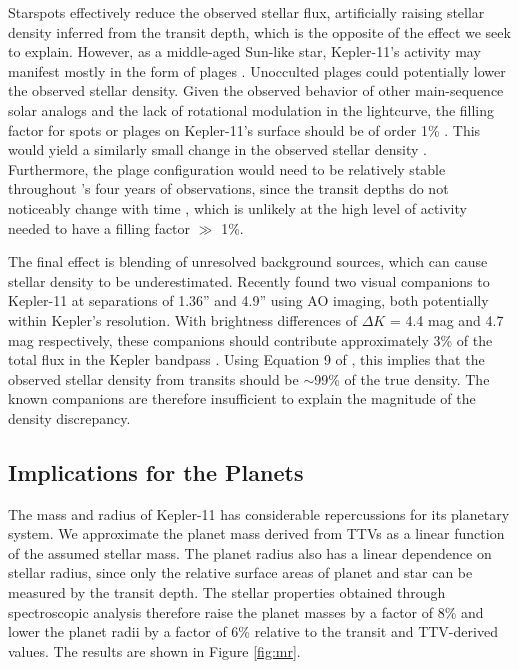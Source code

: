 \documentclass[oneside]{emulateapj}
\begin{document}
Starspots effectively reduce the observed stellar flux, artificially raising stellar density inferred from the transit depth, which is the opposite of the effect we seek to explain. However, as a middle-aged Sun-like star, Kepler-11's activity may manifest mostly in the form of plages . Unocculted plages could potentially lower the observed stellar density. Given the observed behavior of other main-sequence solar analogs and the lack of rotational modulation in the \Kepler lightcurve, the filling factor for spots or plages on Kepler-11's surface should be of order 1\% . This would yield a similarly small change in the observed stellar density \citep[O($10^{-2}$),][]{Kipping2014}. Furthermore, the plage configuration would need to be relatively stable throughout \Kepler's four years of observations, since the transit depths do not noticeably change with time , which is unlikely at the high level of activity needed to have a filling factor $\gg$ 1\%.

The final effect is blending of unresolved background sources, which can cause stellar density to be underestimated. Recently \citet{Wang2015} found two visual companions to Kepler-11 at separations of 1.36'' and 4.9'' using AO imaging, both potentially within Kepler's resolution. With brightness differences of $\Delta K$ = 4.4 mag and 4.7 mag respectively, these companions should contribute approximately 3\% of the total flux in the Kepler bandpass . Using Equation 9 of \citet{Kipping2014}, this implies that the observed stellar density from transits should be $\sim$99\% of the true density. The known companions are therefore insufficient to explain the magnitude of the density discrepancy.


\subsection{Implications for the Planets}

The mass and radius of Kepler-11 has considerable repercussions for its planetary system. We approximate the planet mass derived from TTVs as a linear function of the assumed stellar mass. The planet radius also has a linear dependence on stellar radius, since only the relative surface areas of planet and star can be measured by the transit depth. The stellar properties obtained through spectroscopic analysis therefore raise the planet masses by a factor of 8\% and lower the planet radii by a factor of 6\% relative to the transit and TTV-derived values. The results are shown in Figure \ref{fig:mr}.
\end{document}
